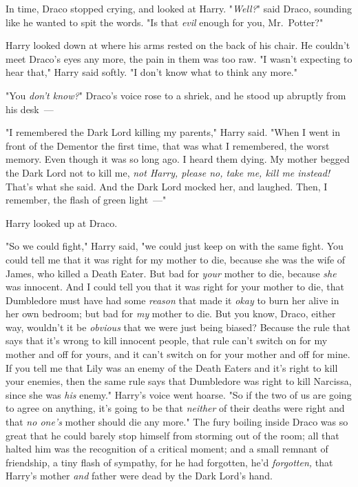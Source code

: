 In time, Draco stopped crying, and looked at Harry. "\emph{Well?}" said Draco,
sounding like he wanted to spit the words. "Is that \emph{evil} enough for you,
Mr.~Potter?"

Harry looked down at where his arms rested on the back of his chair. He
couldn't meet Draco's eyes any more, the pain in them was too raw. "I wasn't
expecting to hear that," Harry said softly. "I don't know what to think any
more."

"You \emph{don't know?}" Draco's voice rose to a shriek, and he stood up
abruptly from his desk~---

"I remembered the Dark Lord killing my parents," Harry said. "When I went in
front of the Dementor the first time, that was what I remembered, the worst
memory. Even though it was so long ago. I heard them dying. My mother begged
the Dark Lord not to kill me, \emph{not Harry, please no, take me, kill me
instead!} That's what she said. And the Dark Lord mocked her, and laughed.
Then, I remember, the flash of green light~---"

Harry looked up at Draco.

"So we could fight," Harry said, "we could just keep on with the same fight.
You could tell me that it was right for my mother to die, because she was the
wife of James, who killed a Death Eater. But bad for \emph{your} mother to die,
because \emph{she} was innocent. And I could tell you that it was right for
your mother to die, that Dumbledore must have had some \emph{reason} that made
it \emph{okay} to burn her alive in her own bedroom; but bad for \emph{my}
mother to die. But you know, Draco, either way, wouldn't it be \emph{obvious}
that we were just being biased? Because the rule that says that it's wrong to
kill innocent people, that rule can't switch on for my mother and off for
yours, and it can't switch on for your mother and off for mine. If you tell me
that Lily was an enemy of the Death Eaters and it's right to kill your enemies,
then the same rule says that Dumbledore was right to kill Narcissa, since she
was \emph{his} enemy." Harry's voice went hoarse. "So if the two of us are
going to agree on anything, it's going to be that \emph{neither} of their
deaths were right and that \emph{no one's} mother should die any more."
\sbreak
The fury boiling inside Draco was so great that he could barely stop himself
from storming out of the room; all that halted him was the recognition of a
critical moment; and a small remnant of friendship, a tiny flash of sympathy,
for he had forgotten, he'd \emph{forgotten,} that Harry's mother \emph{and}
father were dead by the Dark Lord's hand.

